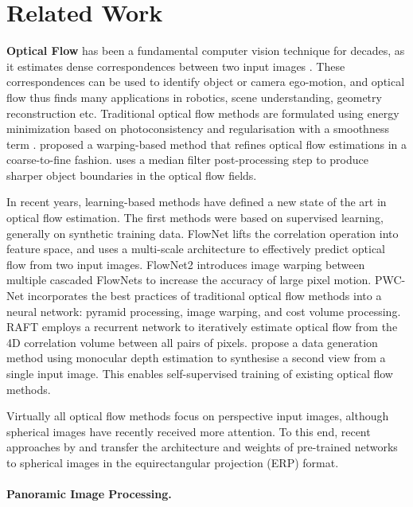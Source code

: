 \section{Related Work}

\textbf{Optical Flow}
has been a fundamental computer vision technique for decades, as it estimates dense correspondences between two input images \cite{BakerSLRBS2011,MenzeHG2018}.
These correspondences can be used to identify object or camera ego-motion, and optical flow thus finds many applications in robotics, scene understanding, geometry reconstruction etc.
Traditional optical flow methods are formulated using energy minimization based on photoconsistency and regularisation with a smoothness term \cite{KroegTDV2016, HornS1981, LucasK1981, BlackA1991}.
\citet{BroxBPW2004} proposed a warping-based method that refines optical flow estimations in a coarse-to-fine fashion.
\citet{SunRB2014} uses a median filter post-processing step to produce sharper object boundaries in the optical flow fields.


In recent years, learning-based methods have defined a new state of the art in optical flow estimation.
The first methods were based on supervised learning, generally on synthetic training data.
FlowNet \cite{DosovFIHHGSCB2015} lifts the correlation operation into feature space, and uses a multi-scale architecture to effectively predict optical flow from two input images.
FlowNet2 \cite{IlgMSKDB2017} introduces image warping between multiple cascaded FlowNets to increase the accuracy of large pixel motion.
PWC-Net \cite{SunYLK2020} incorporates the best practices of traditional optical flow methods into a neural network: pyramid processing, image warping, and cost volume processing.
RAFT \cite{TeedD2020a} employs a recurrent network to iteratively estimate optical flow from the 4D correlation volume between all pairs of pixels. %
\citet{AleotPM2021} propose a data generation method using monocular depth estimation to synthesise a second view from a single input image.
This enables self-supervised training of existing optical flow methods.


Virtually all optical flow methods focus on perspective input images, although spherical images have recently received more attention.
To this end, recent approaches by \citet{ArtizZAD2020} and \citet{BhandZY2020}
transfer the architecture and weights of pre-trained networks \cite{DosovFIHHGSCB2015,HuiTC2018} to spherical images in the equirectangular projection (ERP) format.


\paragraph{Panoramic Image Processing.}

